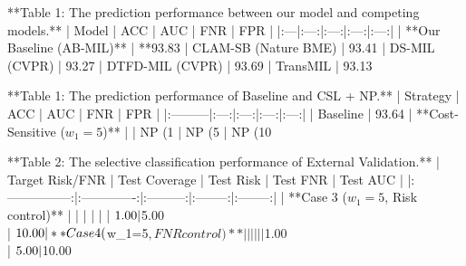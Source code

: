 **Table 1: The prediction performance between our model and competing models.**
| Model | ACC | AUC | FNR | FPR |
|:---|:---:|:---:|:---:|:---:|
| **Our Baseline (AB-MIL)** | **93.83%
| CLAM-SB (Nature BME) | 93.41%
| DS-MIL (CVPR) | 93.27%
| DTFD-MIL (CVPR) | 93.69%
| TransMIL | 93.13%




**Table 1: The prediction performance of Baseline and CSL + NP.**
| Strategy | ACC | AUC | FNR | FPR |
|:---------|:---:|:---:|:---:|:---:|
| Baseline | 93.64%
| **Cost-Sensitive ($w_{1}=5$)** |
| NP (1%
| NP (5%
| NP (10%


**Table 2: The selective classification performance of External Validation.**
| Target Risk/FNR | Test Coverage | Test Risk | Test FNR | Test AUC |
|:---------------:|:-------------:|:---------:|:--------:|:--------:|
| **Case 3 ($w_{1}=5$, Risk control)** | | | | |
| $1.00\\%
| $5.00\\%
| $10.00\\%
| **Case 4 ($w_{1}=5$, FNR control)** | | | | |
| $1.00\\%
| $5.00\\%
| $10.00\\%
